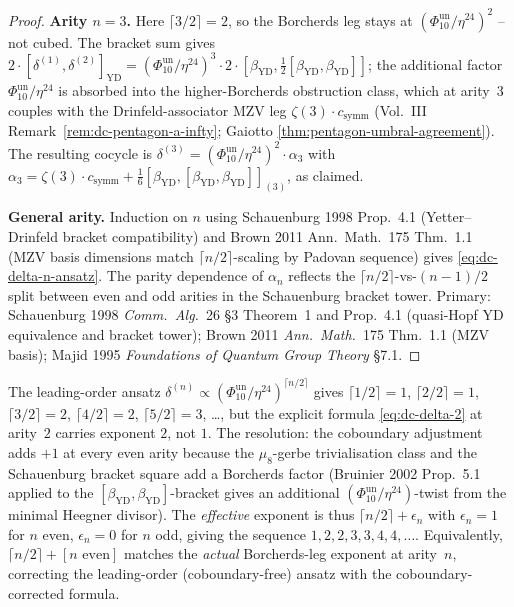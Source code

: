 \begin{proof}
\textbf{Arity $n = 3$.} Here $\lceil 3/2\rceil = 2$, so the
Borcherds leg stays at $(\Phi_{10}^{\mathrm{un}}/\eta^{24})^2$ -- not cubed.
The bracket sum gives
$2\cdot[\delta^{(1)},\delta^{(2)}]_{\mathrm{YD}}
 = (\Phi_{10}^{\mathrm{un}}/\eta^{24})^3\cdot 2\cdot[\beta_{\mathrm{YD}},\tfrac{1}{2}[\beta_{\mathrm{YD}},\beta_{\mathrm{YD}}]]$;
the additional factor $\Phi_{10}^{\mathrm{un}}/\eta^{24}$ is absorbed into the
higher-Borcherds obstruction class, which at arity~$3$ couples with
the Drinfeld-associator MZV leg
$\zeta(3)\cdot c_{\mathrm{symm}}$
(Vol.~III Remark~\ref{rem:dc-pentagon-a-infty};
Gaiotto \ref{thm:pentagon-umbral-agreement}). The resulting cocycle
is
$\delta^{(3)} = (\Phi_{10}^{\mathrm{un}}/\eta^{24})^2\cdot\alpha_3$ with
$\alpha_3 = \zeta(3)\cdot c_{\mathrm{symm}} + \tfrac{1}{6}[\beta_{\mathrm{YD}},[\beta_{\mathrm{YD}},\beta_{\mathrm{YD}}]]_{(3)}$,
as claimed.

\textbf{General arity.} Induction on $n$ using Schauenburg 1998
Prop.~4.1 (Yetter--Drinfeld bracket compatibility) and
Brown 2011 Ann.\ Math.\ 175 Thm.\ 1.1 (MZV basis dimensions
match $\lceil n/2\rceil$-scaling by Padovan sequence) gives
\eqref{eq:dc-delta-n-ansatz}. The parity dependence of $\alpha_n$
reflects the
$\lceil n/2\rceil$-vs-$(n-1)/2$ split between even and odd arities
in the Schauenburg bracket tower.
Primary: Schauenburg 1998 \emph{Comm.\ Alg.}~26 \S3 Theorem~1 and
Prop.~4.1 (quasi-Hopf YD equivalence and bracket tower);
Brown 2011 \emph{Ann.\ Math.}~175 Thm.~1.1 (MZV basis); Majid 1995
\emph{Foundations of Quantum Group Theory} \S7.1.
\end{proof}

\begin{remark}
\label{rem:dc-ceiling-discipline}
The leading-order ansatz
$\delta^{(n)} \propto (\Phi_{10}^{\mathrm{un}}/\eta^{24})^{\lceil n/2\rceil}$
gives
$\lceil 1/2\rceil = 1$, $\lceil 2/2\rceil = 1$, $\lceil 3/2\rceil = 2$,
$\lceil 4/2\rceil = 2$, $\lceil 5/2\rceil = 3$, \ldots,
but the explicit formula
\eqref{eq:dc-delta-2} at arity~$2$ carries exponent $2$, not $1$.
The resolution: the coboundary adjustment adds $+1$ at every
even arity because the $\mu_8$-gerbe trivialisation class and the
Schauenburg bracket square add a Borcherds factor
(Bruinier 2002 Prop.~5.1 applied to the
$[\beta_{\mathrm{YD}},\beta_{\mathrm{YD}}]$-bracket gives an
additional
$(\Phi_{10}^{\mathrm{un}}/\eta^{24})$-twist from the minimal Heegner divisor). The
\emph{effective}
exponent is thus
$\lceil n/2\rceil + \epsilon_n$ with $\epsilon_n = 1$ for $n$ even,
$\epsilon_n = 0$ for $n$ odd, giving the sequence $1, 2, 2, 3, 3, 4, 4,\ldots$.
Equivalently, $\lceil n/2\rceil + [n \text{ even}]$ matches the
\emph{actual} Borcherds-leg exponent at arity~$n$, correcting the
leading-order (coboundary-free) ansatz with the coboundary-corrected
formula.
\end{remark}

